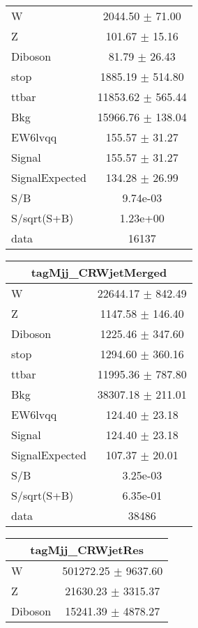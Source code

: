 \begin{table}
\begin{tabular}{|l|c|}
W & 2044.50 $\pm$ 71.00\\
Z & 101.67 $\pm$ 15.16\\
Diboson & 81.79 $\pm$ 26.43\\
stop & 1885.19 $\pm$ 514.80\\
ttbar & 11853.62 $\pm$ 565.44\\
\hline
Bkg & 15966.76 $\pm$ 138.04\\
\hline
EW6lvqq & 155.57 $\pm$ 31.27\\
\hline
Signal & 155.57 $\pm$ 31.27\\
SignalExpected & 134.28 $\pm$ 26.99\\
\hline
S/B & 9.74e-03\\
S/sqrt(S+B) & 1.23e+00\\
\hline
data & 16137\\ \hline
\end{tabular}
\begin{tabular}{|l|c|}
\hline
 \multicolumn{2}{|c|}{tagMjj\_CRWjetMerged}\\ \hline
W & 22644.17 $\pm$ 842.49\\
Z & 1147.58 $\pm$ 146.40\\
Diboson & 1225.46 $\pm$ 347.60\\
stop & 1294.60 $\pm$ 360.16\\
ttbar & 11995.36 $\pm$ 787.80\\
\hline
Bkg & 38307.18 $\pm$ 211.01\\
\hline
EW6lvqq & 124.40 $\pm$ 23.18\\
\hline
Signal & 124.40 $\pm$ 23.18\\
SignalExpected & 107.37 $\pm$ 20.01\\
\hline
S/B & 3.25e-03\\
S/sqrt(S+B) & 6.35e-01\\
\hline
data & 38486\\ \hline
\end{tabular}
\begin{tabular}{|l|c|}
\hline
 \multicolumn{2}{|c|}{tagMjj\_CRWjetRes}\\ \hline
W & 501272.25 $\pm$ 9637.60\\
Z & 21630.23 $\pm$ 3315.37\\
Diboson & 15241.39 $\pm$ 4878.27\\

\end{tabular}
\end{table}
